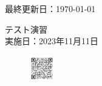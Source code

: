 \documentclass[a4paper,11pt]{jsarticle}
\begin{document}
\begin{titlepage}
  \hfill {最終更新日：\today}
  \begin{center}
    {\Huge\gt テスト演習}\\ \vspace{\baselineskip}
    \textup{\large 実施日：2023年11月11日}\\ 
  \end{center}
  \vfill
  \begin{figure}[H]
    \includegraphics[width=0.1\textwidth]{../graphs/qrcode.png}
  \end{figure}
\end{titlepage}

\qPart

\calcPage

\qPart

\calcPage

\qPart


\brankPage
\end{document}
